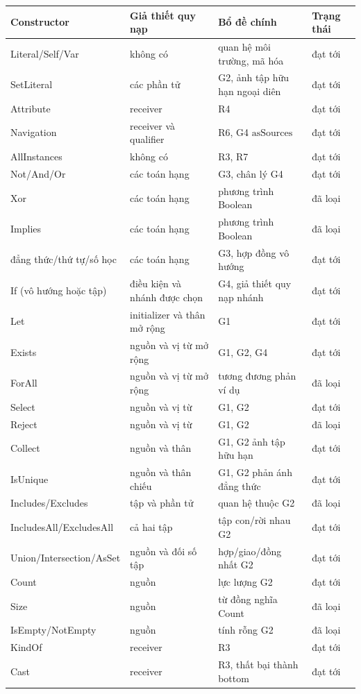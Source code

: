\documentclass[11pt,a4paper]{article}
\theoremstyle{definition}
\newcommand{\asSources}{\mathrm{asSources}}
\begin{document}
\begingroup\scriptsize
\begin{longtable}{p{}p{}p{}p{}}
\toprule Constructor & Giả thiết quy nạp & Bổ đề chính & Trạng thái\\ \midrule
Literal/Self/Var & không có & quan hệ môi trường, mã hóa & đạt tới\\
SetLiteral & các phần tử & G2, ảnh tập hữu hạn ngoại diên & đạt tới\\
Attribute & receiver & R4 & đạt tới\\
Navigation & receiver và qualifier & R6, G4 $\asSources$ & đạt tới\\
AllInstances & không có & R3, R7 & đạt tới\\
Not/And/Or & các toán hạng & G3, chân lý G4 & đạt tới\\
Xor & các toán hạng & phương trình Boolean & đã loại\\
Implies & các toán hạng & phương trình Boolean & đã loại\\
đẳng thức/thứ tự/số học & các toán hạng & G3, hợp đồng vô hướng & đạt tới\\
If (vô hướng hoặc tập) & điều kiện và nhánh được chọn & G4, giả thiết quy nạp nhánh & đạt tới\\
Let & initializer và thân mở rộng & G1 & đạt tới\\
Exists & nguồn và vị từ mở rộng & G1, G2, G4 & đạt tới\\
ForAll & nguồn và vị từ mở rộng & tương đương phản ví dụ & đã loại\\
Select & nguồn và vị từ & G1, G2 & đạt tới\\
Reject & nguồn và vị từ & G1, G2 & đã loại\\
Collect & nguồn và thân & G1, G2 ảnh tập hữu hạn & đạt tới\\
IsUnique & nguồn và thân chiếu & G1, G2 phản ánh đẳng thức & đạt tới\\
Includes/Excludes & tập và phần tử & quan hệ thuộc G2 & đã loại\\
IncludesAll/ExcludesAll & cả hai tập & tập con/rời nhau G2 & đạt tới\\
Union/Intersection/AsSet & nguồn và đối số tập & hợp/giao/đồng nhất G2 & đạt tới\\
Count & nguồn & lực lượng G2 & đạt tới\\
Size & nguồn & từ đồng nghĩa Count & đã loại\\
IsEmpty/NotEmpty & nguồn & tính rỗng G2 & đã loại\\
KindOf & receiver & R3 & đạt tới\\
Cast & receiver & R3, thất bại thành bottom & đạt tới\\
\bottomrule
\end{longtable}
\endgroup
\end{document}
